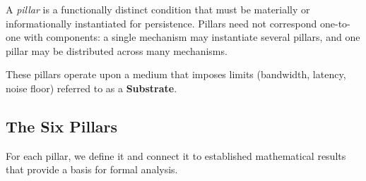 A \emph{pillar} is a functionally distinct condition that must be materially or informationally instantiated for persistence. Pillars need not correspond one-to-one with components: a single mechanism may instantiate several pillars, and one pillar may be distributed across many mechanisms.

These pillars operate upon a medium that imposes limits (bandwidth, latency, noise floor) referred to as a \textbf{Substrate}.


\subsection{The Six Pillars}
\label{subsec:pillars}

For each pillar, we define it and connect it to established mathematical results that provide a basis for formal analysis.

